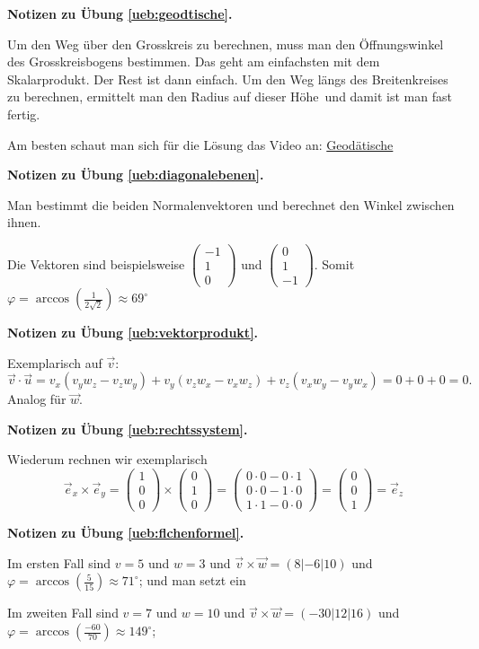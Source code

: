 \documentclass[%
11pt,%
twoside,%
titlepage,%
german,%
headsepline%
]{scrartcl}
\theoremstyle{definition}
\theoremstyle{plain}
\newcommand{\concatueb}[1]{ueb:#1}%
\newcommand{\concatlsg}[1]{lsg:#1}%
\newenvironment{lsg}[1]{%
    \par\noindent\textbf{Notizen zu Übung \ref{\concatueb{#1}}.}%
    \label{\concatlsg{#1}}
}{%
    \par%
}
\begin{document}
\begin{lsg}{geodtische}
Um den Weg über den Grosskreis zu berechnen, muss man den Öffnungswinkel des Grosskreisbogens bestimmen. Das geht am einfachsten mit dem Skalarprodukt. Der Rest ist dann einfach. Um den Weg längs des Breitenkreises zu berechnen, ermittelt man den Radius auf dieser \glqq Höhe\grqq\ und damit ist man fast fertig.

\begin{center}


\end{center}

Am besten schaut man sich für die Lösung das Video an: \href{https://www.youtube.com/watch?v=iEK3A2d_bnA}{Geodätische}
\end{lsg}

\begin{lsg}{diagonalebenen}
Man bestimmt die beiden Normalenvektoren und berechnet den Winkel zwischen ihnen.

Die Vektoren sind beispielsweise $\begin{pmatrix}
    -1\\1\\0
\end{pmatrix}$ und 
$\begin{pmatrix}
    0\\1\\-1
\end{pmatrix}$.
Somit $\varphi=\arccos(\frac{1}{2\sqrt{2}})\approx69^\circ$
\end{lsg}
\begin{lsg}{vektorprodukt}
Exemplarisch auf $\vec{v}$:
$$\vec{v}\cdot\vec{u}=v_x(v_yw_z-v_zw_y)+v_y(v_zw_x-v_xw_z)+v_z(v_xw_y-v_yw_x)=0+0+0=0.$$
Analog für $\vec{w}$.
\end{lsg}
\begin{lsg}{rechtssystem}
Wiederum rechnen wir exemplarisch $$\vec{e}_x\times\vec{e}_y=\begin{pmatrix}
    1\\0\\0
\end{pmatrix}\times\begin{pmatrix}
    0\\1\\0
\end{pmatrix}=\begin{pmatrix}
    0\cdot0-0\cdot1\\0\cdot0-1\cdot0\\1\cdot1-0\cdot0
\end{pmatrix}=\begin{pmatrix}
    0\\0\\1
\end{pmatrix}=\vec{e}_z$$
\end{lsg}
\begin{lsg}{flchenformel}
    Im ersten Fall sind $v=5$ und $w=3$ und $\vec{v}\times\vec{w}=(8|-6|10)$ und $\varphi=\arccos(\frac{5}{15})\approx71^\circ$; und man setzt ein \checkmark

    Im zweiten Fall sind $v=7$ und $w=10$ und $\vec{v}\times\vec{w}=(-30|12|16)$ und $\varphi=\arccos(\frac{-60}{70})\approx149^\circ$; \checkmark
\end{lsg}
\end{document}
